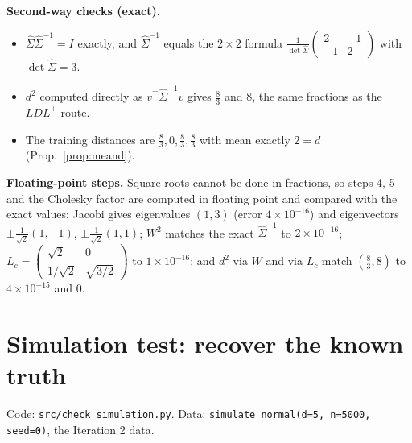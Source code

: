 \documentclass[11pt]{article}
\theoremstyle{definition}
\newcommand{\T}{^{\top}}
\begin{document}
\textbf{Second-way checks (exact).}
\begin{itemize}
\item $\hat\Sigma\hat\Sigma^{-1}=I$ exactly, and $\hat\Sigma^{-1}$ equals the $2\times2$ formula $\frac{1}{\det\hat\Sigma}\begin{pmatrix}2&-1\\-1&2\end{pmatrix}$ with $\det\hat\Sigma=3$.
\item $d^2$ computed directly as $v\T\hat\Sigma^{-1}v$ gives $\tfrac83$ and $8$, the same fractions as the $LDL\T$ route.
\item The training distances are $\tfrac83,0,\tfrac83,\tfrac83$ with mean exactly $2=d$ (Prop.~\ref{prop:meand}).
\end{itemize}

\textbf{Floating-point steps.} Square roots cannot be done in fractions, so steps 4, 5 and the Cholesky factor are computed in floating point and compared with the exact values: Jacobi gives eigenvalues $(1,3)$ (error $4\times10^{-16}$) and eigenvectors $\pm\tfrac1{\sqrt2}(1,-1)$, $\pm\tfrac1{\sqrt2}(1,1)$; $W^2$ matches the exact $\hat\Sigma^{-1}$ to $2\times10^{-16}$; $L_c=\begin{pmatrix}\sqrt2&0\\1/\sqrt2&\sqrt{3/2}\end{pmatrix}$ to $1\times10^{-16}$; and $d^2$ via $W$ and via $L_c$ match $(\tfrac83,8)$ to $4\times10^{-15}$ and $0$.

\section{Simulation test: recover the known truth}\label{sec:simtest}
Code: \texttt{src/check\_simulation.py}. Data: \texttt{simulate\_normal(d=5, n=5000, seed=0)}, the Iteration 2 data.
\end{document}
